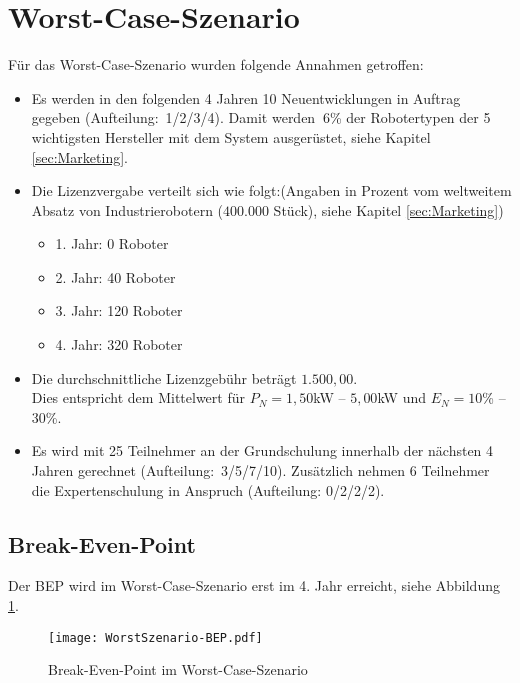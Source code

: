 \section{Worst-Case-Szenario}
Für das Worst-Case-Szenario wurden folgende Annahmen getroffen:
\begin{itemize}
	\item Es werden in den folgenden 4 Jahren 10 Neuentwicklungen in Auftrag gegeben (Aufteilung:~1/2/3/4). Damit werden $~6$\% der Robotertypen der 5 wichtigsten Hersteller mit dem System ausgerüstet, siehe Kapitel \ref{sec:Marketing}.
	\item Die Lizenzvergabe verteilt sich wie folgt:\newline (Angaben in Prozent vom weltweitem Absatz von Industrierobotern ($400.000$ Stück), siehe Kapitel \ref{sec:Marketing})
	\begin{itemize}
		\item 1. Jahr: 0 Roboter
		\item 2. Jahr: 40 Roboter
		\item 3. Jahr: 120 Roboter
		\item 4. Jahr: 320 Roboter
	\end{itemize}
	\item Die durchschnittliche Lizenzgebühr beträgt $1.500,00$\officialeuro.\\ Dies entspricht dem Mittelwert für $P_N = 1,50$kW -- $5,00$kW und $E_N = 10$\% -- $30$\%.
	\item Es wird mit 25 Teilnehmer an der Grundschulung innerhalb der nächsten 4 Jahren gerechnet (Aufteilung:~3/5/7/10). Zusätzlich nehmen 6 Teilnehmer die Expertenschulung in Anspruch (Aufteilung: 0/2/2/2).
\end{itemize}

\subsection{Break-Even-Point}
Der BEP wird im Worst-Case-Szenario erst im 4. Jahr erreicht, siehe Abbildung \ref{fig:WorstSzenario-BEP}.
\begin{figure}[h]
	\centering
	\texttt{[image: WorstSzenario-BEP.pdf]}
	\caption{Break-Even-Point im Worst-Case-Szenario}
	\label{fig:WorstSzenario-BEP}
\end{figure}

